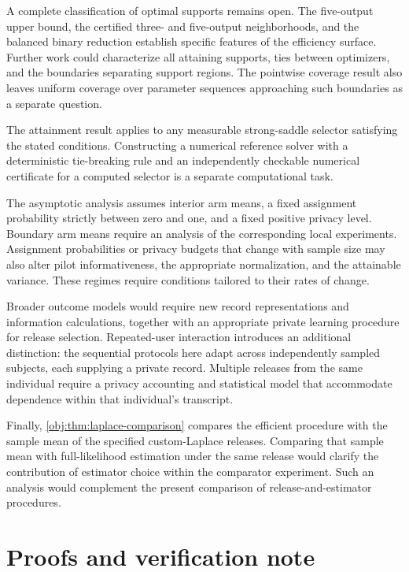 \documentclass[11pt]{article}
\begin{document}
A complete classification of optimal supports remains open. The five-output upper bound, the certified three- and five-output neighborhoods, and the balanced binary reduction establish specific features of the efficiency surface. Further work could characterize all attaining supports, ties between optimizers, and the boundaries separating support regions. The pointwise coverage result also leaves uniform coverage over parameter sequences approaching such boundaries as a separate question.

The attainment result applies to any measurable strong-saddle selector satisfying the stated conditions. Constructing a numerical reference solver with a deterministic tie-breaking rule and an independently checkable numerical certificate for a computed selector is a separate computational task.

The asymptotic analysis assumes interior arm means, a fixed assignment probability strictly between zero and one, and a fixed positive privacy level. Boundary arm means require an analysis of the corresponding local experiments. Assignment probabilities or privacy budgets that change with sample size may also alter pilot informativeness, the appropriate normalization, and the attainable variance. These regimes require conditions tailored to their rates of change.

Broader outcome models would require new record representations and information calculations, together with an appropriate private learning procedure for release selection. Repeated-user interaction introduces an additional distinction: the sequential protocols here adapt across independently sampled subjects, each supplying a private record. Multiple releases from the same individual require a privacy accounting and statistical model that accommodate dependence within that individual's transcript.

Finally, \cref{obj:thm:laplace-comparison} compares the efficient procedure with the sample mean of the specified custom-Laplace releases. Comparing that sample mean with full-likelihood estimation under the same release would clarify the contribution of estimator choice within the comparator experiment. Such an analysis would complement the present comparison of release-and-estimator procedures.


\section{Proofs and verification note}
\label{sec:proofs}
\end{document}
